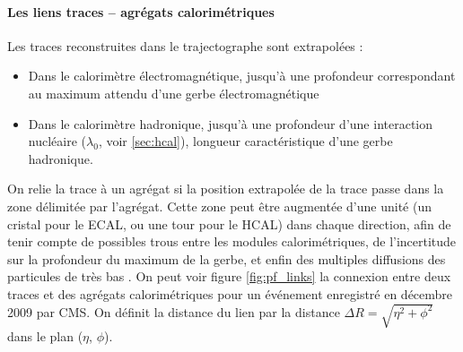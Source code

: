 \paragraph{Les liens traces – agrégats calorimétriques}

Les traces reconstruites dans le trajectographe sont extrapolées :
\begin{itemize}
  \item Dans le calorimètre électromagnétique, jusqu'à une profondeur correspondant au maximum attendu d'une gerbe électromagnétique
  \item Dans le calorimètre hadronique, jusqu'à une profondeur d'une interaction nucléaire ($\lambda_0$, voir \cref{sec:hcal}), longueur caractéristique d'une gerbe hadronique.
\end{itemize}

On relie la trace à un agrégat si la position extrapolée de la trace passe dans la zone délimitée par l'agrégat. Cette zone peut être augmentée d'une unité (un cristal pour le ECAL, ou une tour pour le HCAL) dans chaque direction, afin de tenir compte de possibles trous entre les modules calorimétriques, de l'incertitude sur la profondeur du maximum de la gerbe, et enfin des multiples diffusions des particules de très bas \pt. On peut voir figure \ref{fig:pf_links} la connexion entre deux traces et des agrégats calorimétriques pour un événement enregistré en décembre 2009 par CMS. On définit la distance du lien par la distance $\Delta R = \sqrt{\eta^2 + \phi^2}$ dans le plan ($\eta$, $\phi$).

